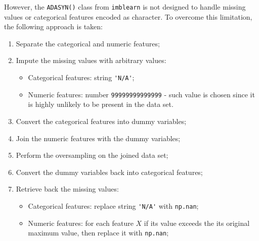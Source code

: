 However, the \lstinline{ADASYN()} class from \lstinline{imblearn} is not designed to handle missing values or categorical features encoded as character. To overcome this limitation, the following approach is taken:
\begin{enumerate}\setlength\itemsep{0em} 
\item Separate the categorical and numeric features;
\item Impute the missing values with arbitrary values:
\begin{itemize}
\item Categorical features: string \lstinline{'N/A'};
\item Numeric features: number \lstinline{99999999999999} - such value is chosen since it is highly unlikely to be present in the data set.
\end{itemize}
\item Convert the categorical features into dummy variables;
\item Join the numeric features with the dummy variables;
\item Perform the oversampling on the joined data set;
\item Convert the dummy variables back into categorical features;
\item Retrieve back the missing values:
\begin{itemize}
\item Categorical features: replace string \lstinline{'N/A'} with \lstinline{np.nan};
\item Numeric features: for each feature $X$ if its value exceeds the its original maximum value, then replace it with \lstinline{np.nan};
\end{itemize}
\end{enumerate}


